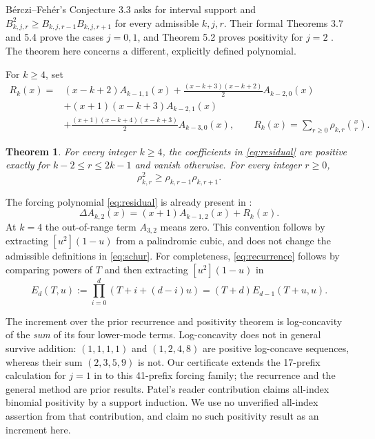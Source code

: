 \documentclass[11pt]{article}
\newtheorem{theorem}{Theorem}
\begin{document}
B\'erczi--Feh\'er's Conjecture 3.3 asks for interval support and
$B_{k,j,r}^2\geq B_{k,j,r-1}B_{k,j,r+1}$ for every admissible $k,j,r$.
Their formal Theorems 3.7 and 5.4 prove the cases $j=0,1$, and
Theorem 5.2 proves positivity for $j=2$ \cite{BercziFeher2026}.
The theorem here concerns a different, explicitly defined polynomial.

For $k\geq4$, set
\begin{equation}\label{eq:residual}
\begin{aligned}
R_k(x)={}&(x-k+2)A_{k-1,1}(x)
 +\frac{(x-k+3)(x-k+2)}2 A_{k-2,0}(x)\\
&+(x+1)(x-k+3)A_{k-2,1}(x)\\
&+\frac{(x+1)(x-k+4)(x-k+3)}2 A_{k-3,0}(x),
\qquad R_k(x)=\sum_{r\geq0}\rho_{k,r}\binom{x}{r}.
\end{aligned}
\end{equation}

\begin{theorem}\label{thm:main}
For every integer $k\geq4$, the coefficients in \eqref{eq:residual}
are positive exactly for $k-2\leq r\leq2k-1$ and vanish otherwise.
For every integer $r\geq0$,
\begin{equation}\label{eq:main}
\rho_{k,r}^2\geq\rho_{k,r-1}\rho_{k,r+1}.
\end{equation}
\end{theorem}

The forcing polynomial \eqref{eq:residual} is already present in
\cite[equation (5.2)]{BercziFeher2026}:
\begin{equation}\label{eq:recurrence}
\Delta A_{k,2}(x)=(x+1)A_{k-1,2}(x)+R_k(x).
\end{equation}
At $k=4$ the out-of-range term $A_{3,2}$ means zero. This convention
follows by extracting $[u^2](1-u)$ from a palindromic cubic, and does not
change the admissible definitions in \eqref{eq:schur}.
For completeness, \eqref{eq:recurrence} follows by comparing powers of $T$
and then extracting $[u^2](1-u)$ in
\[
E_d(T,u):=\prod_{i=0}^d(T+i+(d-i)u)
=(T+d)E_{d-1}(T+u,u).
\]

The increment over the prior recurrence and positivity theorem is
log-concavity of the \emph{sum} of its four lower-mode terms. Log-concavity
does not in general survive addition: $(1,1,1,1)$ and $(1,2,4,8)$ are
positive log-concave sequences, whereas their sum $(2,3,5,9)$ is not.
Our certificate extends the 17-prefix calculation for $j=1$ in
\cite[Theorem 5.4]{BercziFeher2026} to this 41-prefix forcing family;
the recurrence and the general method are prior results.
Patel's reader contribution \cite{Patel2026} claims all-index binomial
positivity by a support induction. We use no unverified all-index
assertion from that contribution, and claim no such positivity result
as an increment here.
\end{document}
